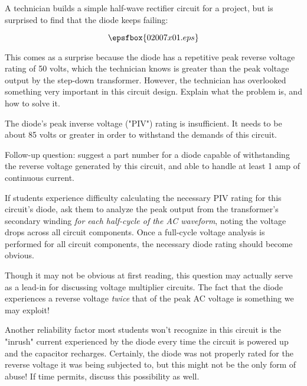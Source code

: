 

A technician builds a simple half-wave rectifier circuit for a project, but is surprised to find that the diode keeps failing:

$$\epsfbox{02007x01.eps}$$

This comes as a surprise because the diode has a repetitive peak reverse voltage rating of 50 volts, which the technician knows is greater than the peak voltage output by the step-down transformer.  However, the technician has overlooked something very important in this circuit design.  Explain what the problem is, and how to solve it.







The diode's peak inverse voltage ("PIV") rating is insufficient.  It needs to be about 85 volts or greater in order to withstand the demands of this circuit.

\vskip 10pt

Follow-up question: suggest a part number for a diode capable of withstanding the reverse voltage generated by this circuit, and able to handle at least 1 amp of continuous current.







If students experience difficulty calculating the necessary PIV rating for this circuit's diode, ask them to analyze the peak output from the transformer's secondary winding {\it for each half-cycle of the AC waveform}, noting the voltage drops across all circuit components.  Once a full-cycle voltage analysis is performed for all circuit components, the necessary diode rating should become obvious.

Though it may not be obvious at first reading, this question may actually serve as a lead-in for discussing voltage multiplier circuits.  The fact that the diode experiences a reverse voltage {\it twice} that of the peak AC voltage is something we may exploit!

Another reliability factor most students won't recognize in this circuit is the "inrush" current experienced by the diode every time the circuit is powered up and the capacitor recharges.  Certainly, the diode was not properly rated for the reverse voltage it was being subjected to, but this might not be the only form of abuse!  If time permits, discuss this possibility as well.




